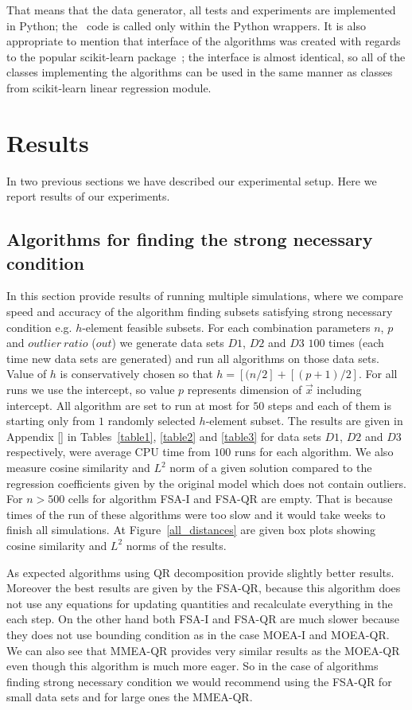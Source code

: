 That means that the data generator, all tests and experiments are implemented in Python; the \CC \  code is called only within the Python wrappers. It is also appropriate to mention that interface of the algorithms was created with regards to the popular scikit-learn package~\cite{scikit-learn}; the interface is almost identical, so all of the classes implementing the algorithms can be used in the same manner as classes from scikit-learn linear regression module.


\section{Results}
In two previous sections we have described our experimental setup. Here we report results of our experiments.

\subsection{Algorithms for finding the strong necessary condition}
In this section provide results of running multiple simulations, where we compare speed and accuracy of the algorithm finding subsets satisfying strong necessary condition e.g. $h$-element feasible subsets. For each combination parameters $n$, $p$ and $outlier~ratio$ ($out$) we generate data sets  $D1$, $D2$ and $D3$ $100$ times (each time new data sets are generated) and run all algorithms on those data sets. Value of $h$ is conservatively chosen so that $h = [(n/2] + [(p+1)/2]$. For all runs we use the intercept, so value $p$ represents dimension of $\vec{x}$ including intercept. All algorithm are set to run at most for $50$ steps and each of them is starting only from $1$ randomly selected $h$-element subset.  The results are given in Appendix [] in Tables~\ref{table1}, \ref{table2} and \ref{table3} for data sets $D1$, $D2$ and $D3$ respectively, were average CPU time from $100$ runs for each algorithm. We also measure cosine similarity and $L^2$ norm of a given solution compared to the regression coefficients given by the original model which does not contain outliers. For $n > 500$ cells for algorithm FSA-I and FSA-QR are empty. That is because times of the run of these algorithms were too slow and it would take weeks to finish all simulations.
At Figure~\ref{all_distances} are given box plots showing cosine similarity and $L^2$ norms of the results. 

As expected algorithms using QR decomposition provide slightly better results. Moreover the best results are given by the FSA-QR, because this algorithm does not use any equations for updating quantities and recalculate everything in the each step. On the other hand both FSA-I and FSA-QR are much slower because they does not use bounding condition as in the case MOEA-I and MOEA-QR. We can also see that MMEA-QR provides very similar results as the MOEA-QR even though this algorithm is much more eager. So in the case of algorithms finding strong necessary condition we would recommend using the FSA-QR for small data sets and for large ones the MMEA-QR. 


